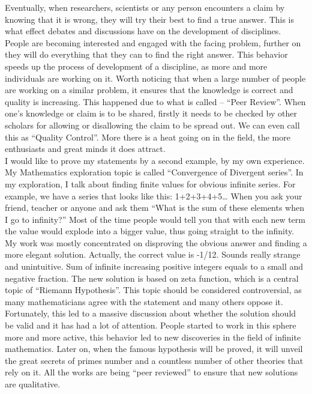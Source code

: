 \documentclass[12pt,a4paper]{article}
\begin{document}
Eventually, when researchers, scientists or any person encounters a claim by knowing that it is wrong, they will try their best to find a true answer. This is what effect debates and discussions have on the development of disciplines. People are becoming interested and engaged with the facing problem, further on they will do everything that they can to find the right answer. This behavior speeds up the process of development of a discipline, as more and more individuals are working on it. Worth noticing that when a large number of people are working on a similar problem, it ensures that the knowledge is correct and quality is increasing. This happened due to what is called – “Peer Review”\cite{tok}. When one’s knowledge or claim is to be shared, firstly it needs to be checked by other scholars for allowing or disallowing the claim to be spread out. We can even call this as “Quality Control”. More there is a heat going on in the field, the more enthusiasts and great minds it does attract. \\

I would like to prove my statements by a second example, by my own experience. My Mathematics exploration topic is called “Convergence of Divergent series”\cite{cods}. In my exploration, I talk about finding finite values for obvious infinite series. For example, we have a series that looks like this: 1+2+3+4+5… When you ask your friend, teacher or anyone and ask them “What is the sum of these elements when I go to infinity?” Most of the time people would tell you that with each new term the value would explode into a bigger value, thus going straight to the infinity. My work was mostly concentrated on disproving the obvious answer and finding a more elegant solution. Actually, the correct value is -1/12. Sounds really strange and unintuitive. Sum of infinite increasing positive integers equals to a small and negative fraction. The new solution is based on zeta function\cite{zeta}, which is a central topic of “Riemann Hypothesis”\cite{hypot}. This topic should be considered controversial, as many mathematicians agree with the statement and many others oppose it. Fortunately, this led to a massive discussion about whether the solution should be valid and it has had a lot of attention. People started to work in this sphere more and more active, this behavior led to new discoveries in the field of infinite mathematics. Later on, when the famous hypothesis will be proved, it will unveil the great secrets of primes number and a countless number of other theories that rely on it. All the works are being “peer reviewed” to ensure that new solutions are qualitative.\\
\end{document}
